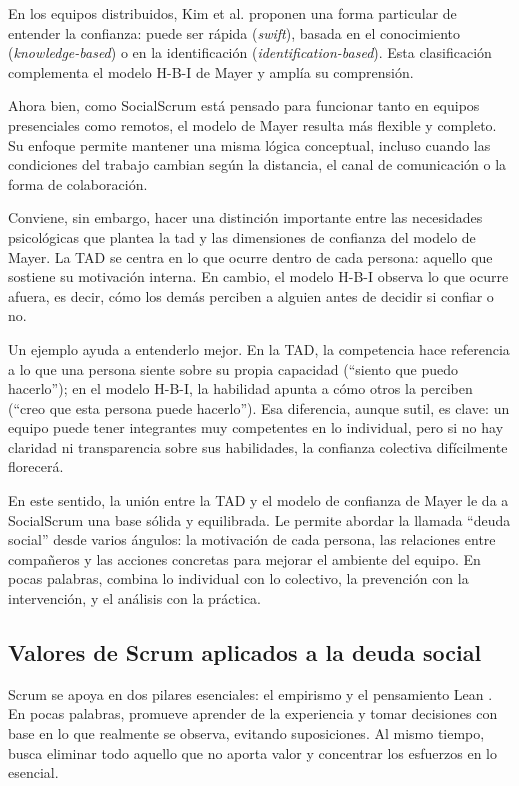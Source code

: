En los equipos distribuidos, Kim et al. \cite{kim2009individual} proponen una forma particular de entender la confianza: puede ser rápida (\textit{swift}), basada en el conocimiento (\textit{knowledge-based}) o en la identificación (\textit{identification-based}). Esta clasificación complementa el modelo H-B-I de Mayer y amplía su comprensión.

Ahora bien, como SocialScrum está pensado para funcionar tanto en equipos presenciales como remotos, el modelo de Mayer resulta más flexible y completo. Su enfoque permite mantener una misma lógica conceptual, incluso cuando las condiciones del trabajo cambian según la distancia, el canal de comunicación o la forma de colaboración.

Conviene, sin embargo, hacer una distinción importante entre las necesidades psicológicas que plantea la \acrfull{tad} y las dimensiones de confianza del modelo de Mayer. La TAD se centra en lo que ocurre dentro de cada persona: aquello que sostiene su motivación interna. En cambio, el modelo H-B-I observa lo que ocurre afuera, es decir, cómo los demás perciben a alguien antes de decidir si confiar o no.

Un ejemplo ayuda a entenderlo mejor. En la TAD, la competencia hace referencia a lo que una persona siente sobre su propia capacidad (``siento que puedo hacerlo''); en el modelo H-B-I, la habilidad apunta a cómo otros la perciben (``creo que esta persona puede hacerlo''). Esa diferencia, aunque sutil, es clave: un equipo puede tener integrantes muy competentes en lo individual, pero si no hay claridad ni transparencia sobre sus habilidades, la confianza colectiva difícilmente florecerá.

En este sentido, la unión entre la TAD y el modelo de confianza de Mayer le da a SocialScrum una base sólida y equilibrada. Le permite abordar la llamada ``deuda social'' desde varios ángulos: la motivación de cada persona, las relaciones entre compañeros y las acciones concretas para mejorar el ambiente del equipo. En pocas palabras, combina lo individual con lo colectivo, la prevención con la intervención, y el análisis con la práctica.

\subsection{Valores de Scrum aplicados a la deuda social}

Scrum se apoya en dos pilares esenciales: el empirismo y el pensamiento Lean \cite{schwaber2020scrum}. En pocas palabras, promueve aprender de la experiencia y tomar decisiones con base en lo que realmente se observa, evitando suposiciones. Al mismo tiempo, busca eliminar todo aquello que no aporta valor y concentrar los esfuerzos en lo esencial.

